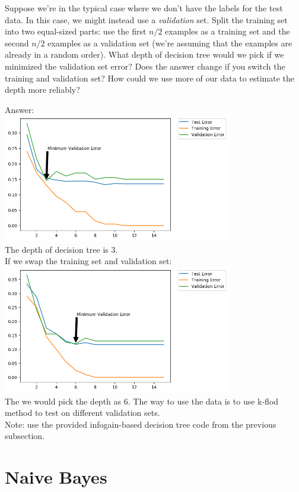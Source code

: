\documentclass{article}
\def\ans#1{\par\gre{Answer: #1}}
\def\blu#1{{\color{blu}#1}}
\def\gre#1{{\color{gre}#1}}
\begin{document}
Suppose we're in the typical case where we don't have the labels for the test data. In this case, we might instead use a \emph{validation} set. Split the training set into two equal-sized parts: use the first $n/2$ examples as a training set and the second $n/2$ examples as a validation set (we're assuming that the examples are already in a random order). \blu{What depth of decision tree would we pick if we minimized the validation set error? Does the answer change if you switch the training and validation set? How could we use more of our data to  estimate the depth more reliably?}
\ans{\\\includegraphics[width = 10cm]{Q1WithValidationError.png}\\
The depth of decision tree is 3.\\
If we swap the training set and validation set:\\
\includegraphics[width = 10cm]{Q1WithValidationErrorReversed.png}
\\The we would pick the depth as 6. The way to use the data is to use k-flod method to test on different validation sets.}
\\Note: use the provided infogain-based decision tree code from the previous subsection.



\section{Naive Bayes}
\end{document}
